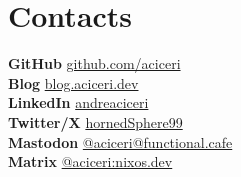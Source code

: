 \documentclass[]{cv}
\begin{document}
\begin{minipage}[t]{0.24\textwidth}
\section{Contacts}
{\bf GitHub} \textrm{\href{https://github.com/}{github.com/aciceri}} \\
{\bf Blog} \href{https://blog.aciceri.dev}{blog.aciceri.dev} \\
{\bf LinkedIn} \href{https://www.linkedin.com/}{andreaciceri} \\
{\bf Twitter/X} \href{https://x.com/hornedSphere99}{hornedSphere99} \\
{\bf Mastodon} \href{https://functional.cafe/@aciceri}{@aciceri@functional.cafe} \\
{\bf Matrix} \href{https://matrix.to/#/@aciceri:nixos.dev}{@aciceri:nixos.dev}
\sectionsep

\end{minipage}
\end{document}
